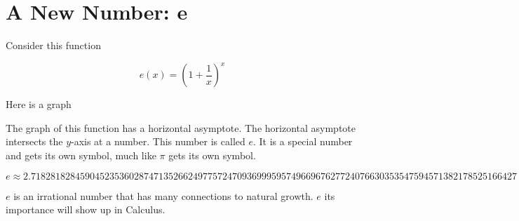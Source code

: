\documentclass{ximera}
\begin{document}
\section{A New Number: e}


Consider this function 

\[
e(x) = \left(1 + \frac{1}{x}\right)^x
\]



Here is a graph


\begin{center}
\end{center}


The graph of this function has a horizontal asymptote.  The horizontal asymptote intersects the $y$-axis at a number.  This number is called $e$.   It is a special number and gets its own symbol, much like $\pi$ gets its own symbol.



\[
e \approx  2.718281828459045235360287471352662497757247093699959574966967627724076630353547594571382178525166427
\]


$e$ is an irrational number that has many connections to natural growth.  $e$ its importance will show up in Calculus.
\end{document}
